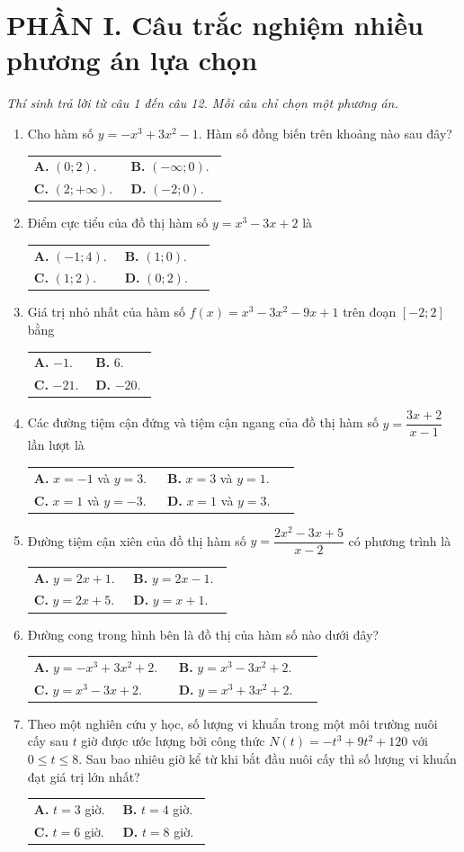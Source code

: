 \documentclass[12pt,a4paper]{article}
\makeatletter
\newcommand{\bonpa}[4]{\par\nobreak\smallskip\nobreak\noindent
\begin{tabular}{@{}p{0.47\linewidth}p{0.47\linewidth}@{}}
\textbf{A.} #1 & \textbf{B.} #2\\[8pt]
\textbf{C.} #3 & \textbf{D.} #4\end{tabular}}
\makeatother
\begin{document}
\section*{\large PHẦN I. Câu trắc nghiệm nhiều phương án lựa chọn}
\textit{Thí sinh trả lời từ câu 1 đến câu 12. Mỗi câu chỉ chọn một phương án.}
\begin{enumerate}
\item Cho hàm số $y=-x^3+3x^2-1$. Hàm số đồng biến trên khoảng nào sau đây?
\bonpa{$(0;2)$.}{$(-\infty;0)$.}{$(2;+\infty)$.}{$(-2;0)$.}

\item Điểm cực tiểu của đồ thị hàm số $y=x^3-3x+2$ là
\bonpa{$(-1;4)$.}{$(1;0)$.}{$(1;2)$.}{$(0;2)$.}

\item Giá trị nhỏ nhất của hàm số $f(x)=x^3-3x^2-9x+1$ trên đoạn $[-2;2]$ bằng
\bonpa{$-1$.}{$6$.}{$-21$.}{$-20$.}

\item Các đường tiệm cận đứng và tiệm cận ngang của đồ thị hàm số $y=\dfrac{3x+2}{x-1}$ lần lượt là
\bonpa{$x=-1$ và $y=3$.}{$x=3$ và $y=1$.}{$x=1$ và $y=-3$.}{$x=1$ và $y=3$.}

\item Đường tiệm cận xiên của đồ thị hàm số $y=\dfrac{2x^2-3x+5}{x-2}$ có phương trình là
\bonpa{$y=2x+1$.}{$y=2x-1$.}{$y=2x+5$.}{$y=x+1$.}

\item Đường cong trong hình bên là đồ thị của hàm số nào dưới đây?
\par\nobreak\smallskip
\begin{minipage}[c]{0.60\linewidth}
\bonpa{$y=-x^3+3x^2+2$.}{$y=x^3-3x^2+2$.}{$y=x^3-3x+2$.}{$y=x^3+3x^2+2$.}
\end{minipage}\hfill
\begin{minipage}[c]{0.36\linewidth}\centering
{}
\end{minipage}

\item Theo một nghiên cứu y học, số lượng vi khuẩn trong một môi trường nuôi cấy sau $t$ giờ được ước lượng bởi công thức
$N(t)=-t^3+9t^2+120$ với $0\le t\le8$. Sau bao nhiêu giờ kể từ khi bắt đầu nuôi cấy thì số lượng vi khuẩn đạt giá trị lớn nhất?
\bonpa{$t=3$ giờ.}{$t=4$ giờ.}{$t=6$ giờ.}{$t=8$ giờ.}
\end{enumerate}
\end{document}
